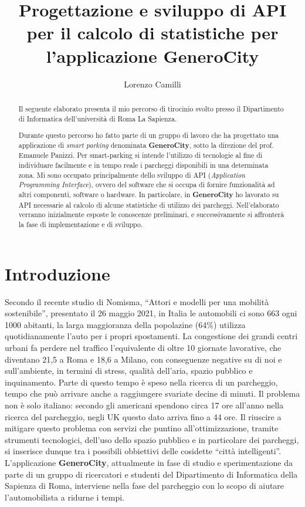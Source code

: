 \documentclass[italian, Lau, oneside, nodefaultfont, noexaminfo]{sapthesis}
\title{Progettazione e sviluppo di API per il calcolo di statistiche per l'applicazione GeneroCity}
\author{Lorenzo Camilli}
\begin{document}
\frontmatter
\maketitle
\begin{abstract}
Il seguente elaborato presenta il mio percorso di tirocinio svolto presso il Dipartimento di Informatica dell'universit\`a di Roma La Sapienza.

Durante questo percorso ho fatto parte di un gruppo di lavoro che ha progettato una applicazione di \textit{smart parking} denominata \textbf{GeneroCity}, sotto la direzione del prof. Emanuele Panizzi. Per smart-parking si intende l'utilizzo di tecnologie al fine di individuare facilmente e in tempo reale i parcheggi disponibili in una determinata zona.   Mi sono occupato principalmente dello sviluppo di API (\textit{Application Programming Interface}), ovvero del software che si occupa di fornire funzionalit\`a ad altri componenti, software o hardware. In particolare, in \textbf{GeneroCity} ho lavorato su API necessarie al  calcolo di alcune statistiche di utilizzo dei parcheggi.
Nell'elaborato verranno inizialmente esposte   le conoscenze preliminari, e successivamente si affronter\`a la fase di implementazione e di sviluppo.

\end{abstract}

\tableofcontents

\mainmatter

\bigskip
\chapter *{Introduzione}

Secondo il recente  studio di Nomisma, ``Attori e modelli per una mobilità sostenibile'', presentato il 26 maggio 2021, in Italia le automobili ci sono 663 ogni 1000 abitanti, la larga maggioranza della popolazine (64\%)  utilizza quotidianamente  l'auto per i propri spostamenti. La  congestione dei grandi centri urbani fa  perdere nel traffico l’equivalente di oltre 10 giornate lavorative, che diventano 21,5   a Roma e 18,6 a Milano, con conseguenze negative su di noi e sull’ambiente, in termini di stress, qualit\`a dell'aria, spazio pubblico  e inquinamento. Parte di questo tempo \`e speso nella ricerca  di un parcheggio, tempo  che pu\`o arrivare anche a raggiungere svariate decine di minuti. Il problema non \`e solo italiano:  secondo \cite{ref:article-parking}  gli americani spendono circa 17 ore all'anno nella ricerca del parcheggio, negli UK questo dato arriva fino a 44 ore.
Il riuscire a mitigare questo problema con servizi che puntino all'ottimizzazione, tramite strumenti tecnologici,  dell'uso dello spazio pubblico e in particolare dei parcheggi, si inserisce dunque tra  i possibili obbiettivi delle cosidette ``citt\`a intelligenti''.  
L'applicazione \textbf{GeneroCity}, attualmente in fase di studio e sperimentazione da parte di un gruppo di ricercatori e studenti del Dipartimento di Informatica della Sapienza di Roma,  interviene nella  fase del parcheggio  con lo  scopo  di   aiutare l'automobilista  a ridurne i tempi.
\end{document}
